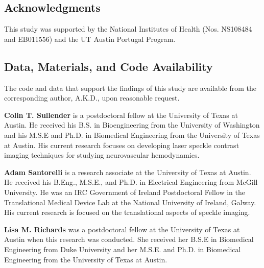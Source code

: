\documentclass[12pt]{spieman}
\begin{document}
\begin{spacing}{2}
\subsection*{Acknowledgments}
This study was supported by the National Institutes of Health (Nos. NS108484 and EB011556) and the UT Austin Portugal Program.

\subsection* {Data, Materials, and Code Availability} 
The code and data that support the findings of this study are available from the corresponding author, A.K.D., upon reasonable request.






\vspace{1ex}
\vspace{2ex}\noindent\textbf{Colin T. Sullender} is a postdoctoral fellow at the University of Texas at Austin. He received his B.S. in Bioengineering from the University of Washington and his M.S.E and Ph.D. in Biomedical Engineering from the University of Texas at Austin. His current research focuses on developing laser speckle contrast imaging techniques for studying neurovascular hemodynamics.

\vspace{2ex}\noindent\textbf{Adam Santorelli} is a research associate at the University of Texas at Austin. He received his B.Eng., M.S.E., and Ph.D. in Electrical Engineering from McGill University. He was an IRC Government of Ireland Postdoctoral Fellow in the Translational Medical Device Lab at the National University of Ireland, Galway. His current research is focused on the translational aspects of speckle imaging.

\vspace{2ex}\noindent\textbf{Lisa M. Richards} was a postdoctoral fellow at the University of Texas at Austin when this research was conducted. She received her B.S.E in Biomedical Engineering from Duke University and her M.S.E. and Ph.D. in Biomedical Engineering from the University of Texas at Austin.


\end{spacing}
\end{document}
